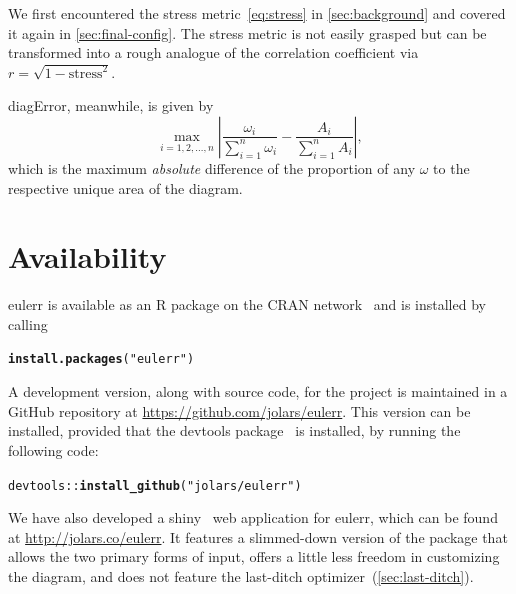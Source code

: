 \documentclass[
  oneside,
  openany,
  numbers=noendperiod,
  parskip=half,
  bibliography=totoc
]{scrbook}\usepackage[]{graphicx}\usepackage{xcolor}
\makeatletter
\newcommand{\hlstr}[1]{\textcolor[rgb]{0.192,0.494,0.8}{#1}}%
\newcommand{\hlopt}[1]{\textcolor[rgb]{0,0,0}{#1}}%
\newcommand{\hlstd}[1]{\textcolor[rgb]{0.345,0.345,0.345}{#1}}%
\newcommand{\hlkwd}[1]{\textcolor[rgb]{0.737,0.353,0.396}{\textbf{#1}}}%
\newenvironment{kframe}{%
 \def\at@end@of@kframe{}%
 \ifinner\ifhmode%
  \def\at@end@of@kframe{\end{minipage}}%
  \begin{minipage}{\columnwidth}%
 \fi\fi%
 \def\FrameCommand##1{\hskip\@totalleftmargin \hskip-\fboxsep
 \colorbox{shadecolor}{##1}\hskip-\fboxsep
     \hskip-\linewidth \hskip-\@totalleftmargin \hskip\columnwidth}%
 \MakeFramed {\advance\hsize-\width
   \@totalleftmargin\z@ \linewidth\hsize
   \@setminipage}}%
 {\par\unskip\endMakeFramed%
 \at@end@of@kframe}
\newenvironment{knitrout}{}{} %
\newcommand{\pkg}[1]{{\fontseries{b}\selectfont #1}}
\makeatother
\begin{document}
We first encountered the stress metric~\eqref{eq:stress} in
\cref{sec:background} and covered it again in \cref{sec:final-config}.
The stress metric is not easily grasped but
can be transformed into a rough analogue of the correlation coefficient via
$r = \sqrt{1-\text{stress}^2}$.

diagError, meanwhile, is given by
\begin{equation}
{\max_{i = 1, 2, \dots, n}}\left|
  \frac{\omega_i}{\sum_{i=1}^n \omega_i} - \frac{A_i}{\sum_{i=1}^n A_i} \right|,
\label{eq:diagError}
\end{equation}
which is the maximum \emph{absolute} difference of the proportion of any
$\omega$ to the respective unique area of the diagram.

\section{Availability}\label{sec:availability}

\pkg{eulerr} is available as an R package on the CRAN network~\citep{RCT_2017a}
and is installed by calling

\begin{knitrout}\small
{}\color{fgcolor}\begin{kframe}
\begin{alltt}
\hlkwd{install.packages}\hlstd{(}\hlstr{"eulerr"}\hlstd{)}
\end{alltt}
\end{kframe}
\end{knitrout}

A development version, along with source code, for the project is maintained in
a GitHub repository at
\url{https://github.com/jolars/eulerr}. This version
can be installed, provided that the \pkg{devtools} package~\citep{Wickham_2017} is installed,
by running the following code:

\begin{knitrout}\small
{}\color{fgcolor}\begin{kframe}
\begin{alltt}
\hlstd{devtools}\hlopt{::}\hlkwd{install_github}\hlstd{(}\hlstr{"jolars/eulerr"}\hlstd{)}
\end{alltt}
\end{kframe}
\end{knitrout}

We have also developed a \pkg{shiny}~\citep{Chang_2017} web application for
\pkg{eulerr}, which can be found at \url{http://jolars.co/eulerr}. It features
a slimmed-down version of the package that
allows the two primary forms of input, offers a little less freedom in customizing the
diagram, and does not feature the last-ditch optimizer~(\cref{sec:last-ditch}).
\end{document}
